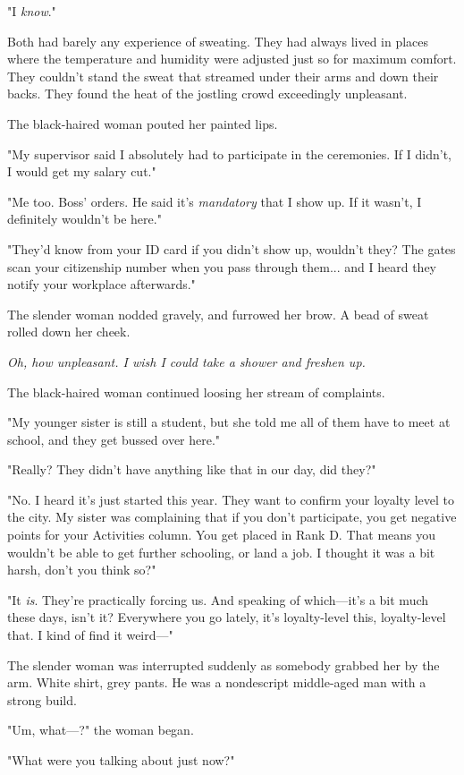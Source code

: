 "I \emph{know}."

Both had barely any experience of sweating. They had always lived in
places where the temperature and humidity were adjusted just so for
maximum comfort. They couldn't stand the sweat that streamed under their
arms and down their backs. They found the heat of the jostling crowd
exceedingly unpleasant.

The black-haired woman pouted her painted lips.

"My supervisor said I absolutely had to participate in the ceremonies.
If I didn't, I would get my salary cut."

"Me too. Boss' orders. He said it's \emph{mandatory} that I show up. If it
wasn't, I definitely wouldn't be here."

"They'd know from your ID card if you didn't show up, wouldn't they? The
gates scan your citizenship number when you pass through them... and I
heard they notify your workplace afterwards."

The slender woman nodded gravely, and furrowed her brow. A bead of sweat
rolled down her cheek.

\emph{Oh, how unpleasant. I wish I could take a shower and freshen up.}

The black-haired woman continued loosing her stream of complaints.

"My younger sister is still a student, but she told me all of them have
to meet at school, and they get bussed over here."

"Really? They didn't have anything like that in our day, did they?"

"No. I heard it's just started this year. They want to confirm your
loyalty level to the city. My sister was complaining that if you don't
participate, you get negative points for your Activities column. You get
placed in Rank D. That means you wouldn't be able to get further
schooling, or land a job. I thought it was a bit harsh, don't you think
so?"

"It \emph{is}. They're practically forcing us. And speaking of which---it's a bit
much these days, isn't it? Everywhere you go lately, it's loyalty-level
this, loyalty-level that. I kind of find it weird---"

The slender woman was interrupted suddenly as somebody grabbed her by
the arm. White shirt, grey pants. He was a nondescript middle-aged man
with a strong build.

"Um, what---?" the woman began.

"What were you talking about just now?"


